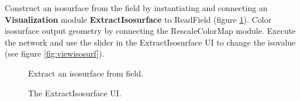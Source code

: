 \documentclass[fleqn,11pt,openany]{book}
\begin{document}
Construct an isosurface from the field by instantiating and connecting an
\textbf{Visualization} module \textbf{ExtractIsosurface} to ReadField
(figure \ref{fig:extract}).
Color isosurface output geometry by connecting the RescaleColorMap module.
Execute the network and use the slider in the ExtractIsosurface UI to change
the isovalue (see figure \ref{fig:viewisosurf}).

\begin{figure}[H]
\caption{Extract an isosurface from field.}
\label{fig:extract}
\end{figure}

\begin{figure}[H]
\caption{The ExtractIsosurface UI.}
\label{fig:changeisoval}
\end{figure}
\end{document}
